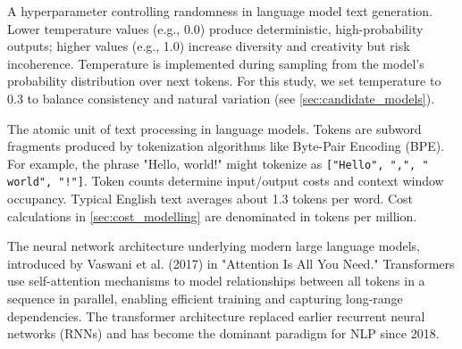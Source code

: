 \begin{description}[style=nextline,leftmargin=0em,itemsep=1em]
\item[\textbf{Temperature (Sampling Parameter)}] A hyperparameter controlling randomness in language model text generation. Lower temperature values (e.g., 0.0) produce deterministic, high-probability outputs; higher values (e.g., 1.0) increase diversity and creativity but risk incoherence. Temperature is implemented during sampling from the model's probability distribution over next tokens. For this study, we set temperature to 0.3 to balance consistency and natural variation (see \cref{sec:candidate_models}).

\item[\textbf{Token}] The atomic unit of text processing in language models. Tokens are subword fragments produced by tokenization algorithms like Byte-Pair Encoding (BPE). For example, the phrase "Hello, world!" might tokenize as \texttt{["Hello", ",", " world", "!"]}. Token counts determine input/output costs and context window occupancy. Typical English text averages about 1.3 tokens per word. Cost calculations in \cref{sec:cost_modelling} are denominated in tokens per million.

\item[\textbf{Transformer Architecture}] The neural network architecture underlying modern large language models, introduced by Vaswani et al. (2017) in "Attention Is All You Need." Transformers use self-attention mechanisms to model relationships between all tokens in a sequence in parallel, enabling efficient training and capturing long-range dependencies. The transformer architecture replaced earlier recurrent neural networks (RNNs) and has become the dominant paradigm for NLP since 2018.

\end{description}
